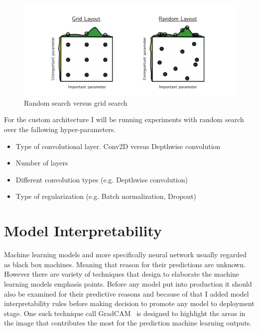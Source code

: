 \begin{figure}[H]
    \centering
    \includegraphics[width=\textwidth]{img/randomsearch.png}
    \caption{Random search versus grid search~\cite{randomsearch}}
    \label{fig:randomsearch}
\end{figure}

For the custom architecture I will be running experiments with random search over the fallowing hyper-parameters.

\begin{itemize}
    \item Type of convolutional layer. Conv2D versus Depthwise convolution
    \item Number of layers
    \item Different convolution types (e.g. Depthwise convolution)
    \item Type of regularization (e.g. Batch normalization, Dropout)
\end{itemize}

\section{Model Interpretability}
Machine learning models and more specifically neural network usually regarded as black box machines.
Meaning that reason for their predictions are unknown.
However there are variety of techniques that design to elaborate the machine learning models emphasis points.
Before any model put into production it should also be examined for their predictive reasons and because of that I added model interpretability rules before making decision to promote any model to deployment stage.
One such technique call GradCAM~\cite{heatmap} is designed to highlight the areas in the image that contributes the most for the prediction machine learning outputs.

